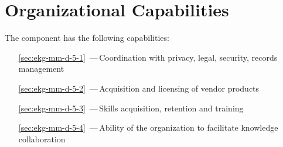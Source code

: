 \chapter{Organizational Capabilities}\label{ch:ekg-mm-d-5}

The  component has the following capabilities:

\begin{itemize}[leftmargin=.5in]
  \item [\ref{sec:ekg-mm-d-5-1}] \,---\,Coordination with privacy, legal, security, records management
  \item [\ref{sec:ekg-mm-d-5-2}] \,---\,Acquisition and licensing of vendor products
  \item [\ref{sec:ekg-mm-d-5-3}] \,---\,Skills acquisition, retention and training
  \item [\ref{sec:ekg-mm-d-5-4}] \,---\,Ability of the organization to facilitate knowledge collaboration
\end{itemize}










